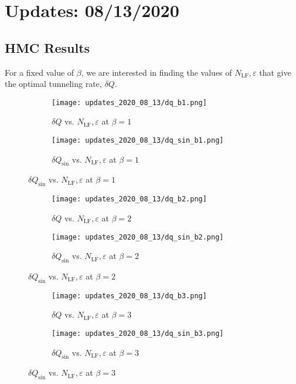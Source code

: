 \section{Updates: 08/13/2020}%
\label{sec:updates_2020_08_13}
\subsection{HMC Results}
%
For a fixed value of \(\beta\), we are interested in finding the values of
\(N_\mathrm{LF}, \varepsilon\) that give the optimal tunneling rate, \(\delta
Q\).
%
\begin{figure}[htpb]
  \centering
  \begin{subfigure}[htpb]{0.40\textwidth}
    \texttt{[image: updates\_2020\_08\_13/dq\_b1.png]}
    \caption{\(\delta Q\) vs. \(N_{\mathrm{LF}}, \varepsilon\) at \(\beta =
    1\)}%
  \end{subfigure}
  \begin{subfigure}[htpb]{0.40\textwidth}
    \texttt{[image: updates\_2020\_08\_13/dq\_sin\_b1.png]}
    \caption{\(\delta Q_{\sin}\) vs. \(N_{\mathrm{LF}}, \varepsilon\)
    at \(\beta = 1\)}%
  \end{subfigure}
\end{figure}
%
\begin{figure}[h!]
  \centering
  \begin{subfigure}[htpb]{0.40\textwidth}
    \texttt{[image: updates\_2020\_08\_13/dq\_b2.png]}
    \caption{\(\delta Q\) vs. \(N_{\mathrm{LF}}, \varepsilon\) at \(\beta =
    2\)}%
  \end{subfigure}
  \begin{subfigure}[htpb]{0.40\textwidth}
    \texttt{[image: updates\_2020\_08\_13/dq\_sin\_b2.png]}
    \caption{\(\delta Q_{\sin}\) vs. \(N_{\mathrm{LF}}, \varepsilon\)
    at \(\beta = 2\)}%
  \end{subfigure}
\end{figure}
%
\begin{figure}[h!]
  \centering
  \begin{subfigure}[htpb]{0.40\textwidth}
    \texttt{[image: updates\_2020\_08\_13/dq\_b3.png]}
    \caption{\(\delta Q\) vs. \(N_{\mathrm{LF}}, \varepsilon\) at \(\beta =
    3\)}%
  \end{subfigure}
  \begin{subfigure}[htpb]{0.40\textwidth}
    \texttt{[image: updates\_2020\_08\_13/dq\_sin\_b3.png]}
    \caption{\(\delta Q_{\sin}\) vs. \(N_{\mathrm{LF}}, \varepsilon\)
    at \(\beta = 3\)}%
  \end{subfigure}
\end{figure}
%

